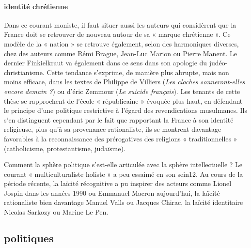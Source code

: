 \paragraph{identité chrétienne}
Dans ce courant moniste, il faut situer aussi les auteurs qui considèrent que la France doit se retrouver de nouveau autour de sa « marque chrétienne ». Ce modèle de la « nation » se retrouve également, selon des harmoniques diverses, chez des auteurs comme Rémi Brague, Jean-Luc Marion ou Pierre Manent. Le dernier Finkielkraut va également dans ce sens dans son apologie du judéo-christianisme. Cette tendance s’exprime, de manière plus abrupte, mais non moins efficace, dans les textes de Philippe de Villiers (\textit{Les cloches sonneront-elles encore demain ?}) ou d’éric Zemmour (\textit{Le suicide français}). Les tenants de cette thèse se rapprochent de l’école « républicaine » évoquée plus haut, en défendant le principe d’une politique restrictive à l’égard des revendications musulmanes. Ils s’en distinguent cependant par le fait que rapportant la France à son identité religieuse, plus qu’à sa provenance rationaliste, ils se montrent davantage favorables à la reconnaissance des prérogatives des religions
« traditionnelles » (catholicisme, protestantisme, judaïsme).

Comment la sphère politique s’est-elle articulée avec la sphère intellectuelle ? Le courant « multiculturaliste holiste » a peu essaimé en son sein12. Au cours de la période récente, la laïcité récognitive a pu inspirer des acteurs comme Lionel Jospin dans les années 1990 ou Emmanuel Macron aujourd’hui, la laïcité rationaliste bien davantage Manuel Valls ou Jacques Chirac, la laïcité identitaire Nicolas Sarkozy ou Marine Le Pen.

\subsection{politiques}
